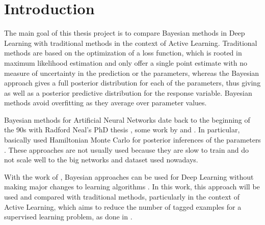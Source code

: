 
\chapter{Introduction}
\label{ch:intro}


The main goal of this thesis project is to compare Bayesian methods in Deep Learning with traditional methods in the context of Active Learning. Traditional methods are based on the optimization of a loss function, which is rooted in maximum likelihood estimation and only offer a single point estimate with no measure of uncertainty in the prediction or the parameters, whereas the Bayesian approach gives a full posterior distribution for each of the parameters, thus giving as well as a posterior predictive distribution for the response variable. Bayesian methods avoid overfitting as they average over parameter values.

Bayesian methods for Artificial Neural Networks date back to the beginning of the 90s with Radford Neal's PhD thesis \cite{neal1996bayesian}, some work by \citeauthor{denker1991transforming} \cite{denker1991transforming} and \citeauthor{mackay1992practical} \cite{mackay1992practical}. In particular, \citeauthor{neal1996bayesian} basically used Hamiltonian Monte Carlo for posterior inferences of the parameters \cite{neal1996bayesian}. These approaches are not usually used because they are slow to train and do not scale well to the big networks and dataset used nowadays.

With the work of \citeauthor{gal2016uncertainty}, Bayesian approaches can be used for Deep Learning without making major changes to learning algorithms \cite{gal2016uncertainty}. In this work, this approach will be used and compared with traditional methods, particularly in the context of Active Learning, which aims to reduce the number of tagged examples for a supervised learning problem, as done in \cite{Gal2016Active}.
